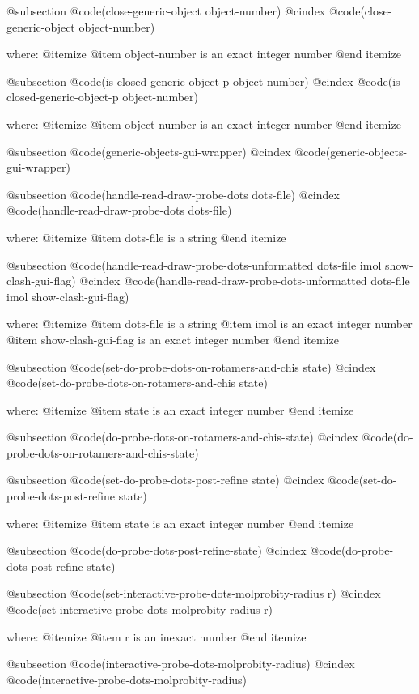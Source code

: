 @subsection @code{(close-generic-object object-number)}
@cindex @code{(close-generic-object object-number)}
 
where: 
 @itemize 
     @item object-number is an exact integer number
 @end itemize


@subsection @code{(is-closed-generic-object-p object-number)}
@cindex @code{(is-closed-generic-object-p object-number)}
 
where: 
 @itemize 
     @item object-number is an exact integer number
 @end itemize


@subsection @code{(generic-objects-gui-wrapper)}
@cindex @code{(generic-objects-gui-wrapper)}
 
@subsection @code{(handle-read-draw-probe-dots dots-file)}
@cindex @code{(handle-read-draw-probe-dots dots-file)}
 
where: 
 @itemize 
     @item dots-file is a string
 @end itemize


@subsection @code{(handle-read-draw-probe-dots-unformatted dots-file imol show-clash-gui-flag)}
@cindex @code{(handle-read-draw-probe-dots-unformatted dots-file imol show-clash-gui-flag)}
 
where: 
 @itemize 
     @item dots-file is a string
     @item imol is an exact integer number
     @item show-clash-gui-flag is an exact integer number
 @end itemize


@subsection @code{(set-do-probe-dots-on-rotamers-and-chis state)}
@cindex @code{(set-do-probe-dots-on-rotamers-and-chis state)}
 
where: 
 @itemize 
     @item state is an exact integer number
 @end itemize


@subsection @code{(do-probe-dots-on-rotamers-and-chis-state)}
@cindex @code{(do-probe-dots-on-rotamers-and-chis-state)}
 
@subsection @code{(set-do-probe-dots-post-refine state)}
@cindex @code{(set-do-probe-dots-post-refine state)}
 
where: 
 @itemize 
     @item state is an exact integer number
 @end itemize


@subsection @code{(do-probe-dots-post-refine-state)}
@cindex @code{(do-probe-dots-post-refine-state)}
 
@subsection @code{(set-interactive-probe-dots-molprobity-radius r)}
@cindex @code{(set-interactive-probe-dots-molprobity-radius r)}
 
where: 
 @itemize 
     @item r is an inexact number
 @end itemize


@subsection @code{(interactive-probe-dots-molprobity-radius)}
@cindex @code{(interactive-probe-dots-molprobity-radius)}
 

